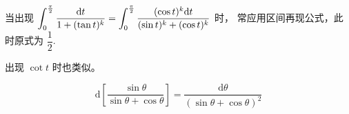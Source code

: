 \begin{Appendices}[附录]

当出现 $ \displaystyle \int_0^\frac{\pi}{2} \dfrac{\mathrm{d}t}{1+(\tan t)^k} = 
\int_0^\frac{\pi}{2} \dfrac{(\cos t)^k\mathrm{d}t}{(\sin t)^k+(\cos t)^k} $ 时，
常应用区间再现公式，此时原式为 $ \dfrac{1}{2}. $ 

出现 $ \cot t $ 时也类似。


$$
    \mathrm{d}\left[\dfrac{\sin \theta}{\sin \theta + \cos \theta}\right] = 
    \dfrac{\mathrm{d}\theta}{(\sin \theta + \cos \theta)^2}
$$

\end{Appendices}
